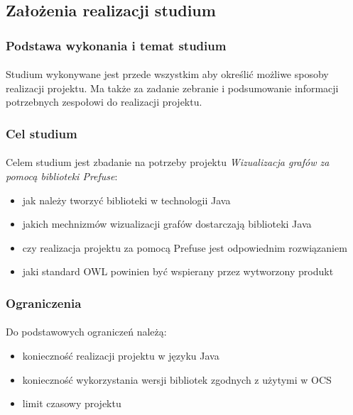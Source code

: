 \newpage


\subsection{Założenia realizacji studium}

\subsubsection{Podstawa wykonania i temat studium}
\paragraph{} Studium wykonywane jest przede wszystkim aby określić możliwe sposoby realizacji projektu. Ma także za zadanie zebranie i podsumowanie informacji potrzebnych zespołowi do realizacji projektu.

\subsubsection{Cel studium}
\paragraph{} Celem studium jest zbadanie na potrzeby projektu \textit{Wizualizacja grafów za pomocą biblioteki Prefuse}:
\begin{itemize}
 	\item jak należy tworzyć biblioteki w technologii Java
 	\item jakich mechnizmów wizualizacji grafów dostarczają biblioteki Java
	\item czy realizacja projektu za pomocą Prefuse jest odpowiednim rozwiązaniem
	\item jaki standard OWL powinien być wspierany przez wytworzony produkt
\end{itemize}

\subsubsection{Ograniczenia}
\paragraph{} Do podstawowych ograniczeń należą:
\begin{itemize}
 	\item konieczność realizacji projektu w języku Java
	\item konieczność wykorzystania wersji bibliotek zgodnych z użytymi w OCS
	\item limit czasowy projektu
\end{itemize}



